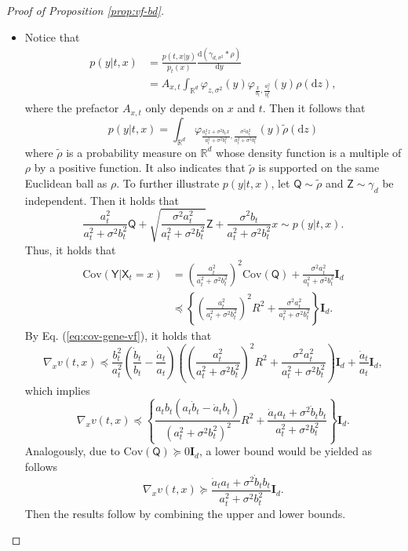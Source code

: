 \documentclass[twoside,11pt]{article}
\def\rmI{{\mathbf{I}}}
\def\sR{{\mathbb{R}}}
\newcommand{\Cov}{\mathrm{Cov}}
\def\paref#1{(\ref{#1})}
\newcommand{\diff}{\mathrm{d}}
\numberwithin{equation}{section}
\begin{document}
\begin{proof} [Proof of Proposition \ref{prop:vf-bd}]
\begin{itemize}
\item[(d)] Notice that
\begin{align*}
    p(y | t, x)
    &= \frac{p(t, x | y)}{p_t (x)} \frac{\diff (\gamma_{d, \sigma^2} * \rho)}{\diff y} \\
    &= A_{x,t} \int_{\sR^d} \varphi_{z, \sigma^2}(y) \varphi_{\tfrac{x}{b_t}, \tfrac{a_t^2}{b_t^2}} (y) \rho(\diff z),
\end{align*}
where the prefactor $A_{x,t}$ only depends on $x$ and $t$.
Then it follows that
\begin{equation*}
    p(y | t, x) = \int_{\sR^d} \varphi_{ \frac{a_t^2 z +\sigma^2 b_t x}{a_t^2 + \sigma^2 b_t^2}, \frac{\sigma^2 a_t^2}{a_t^2 + \sigma^2 b_t^2} }(y) \tilde \rho(\diff z)
\end{equation*}
where $\tilde \rho$ is a probability measure on $\sR^d$ whose density function is a multiple of $\rho$ by a positive function. It also indicates that $\tilde \rho$ is supported on the same Euclidean ball as $\rho$. To further illustrate $p(y | t, x)$, let $\mathsf{Q} \sim \tilde{\rho}$ and $\mathsf{Z} \sim \gamma_d$ be independent. Then it holds that
\begin{equation*}
    \frac{a_t^2}{a_t^2 + \sigma^2 b_t^2} \mathsf{Q} + \sqrt{\frac{\sigma^2 a_t^2}{a_t^2 + \sigma^2 b_t^2}} \mathsf{Z} + \frac{\sigma^2 b_t}{a_t^2 + \sigma^2 b_t^2} x \sim p(y | t, x).
\end{equation*}
Thus, it holds that
\begin{align*}
    \Cov (\mathsf{Y} | \mathsf{X}_t = x)
    &= \left( \frac{a_t^2}{a_t^2 + \sigma^2 b_t^2} \right)^2 \Cov(\mathsf{Q}) + \frac{\sigma^2 a_t^2}{a_t^2 + \sigma^2 b_t^2} \rmI_d \\
    & \preceq \left\{ \left( \frac{a_t^2}{a_t^2 + \sigma^2 b_t^2} \right)^2 R^2 + \frac{\sigma^2 a_t^2}{a_t^2 + \sigma^2 b_t^2} \right\} \rmI_d.
\end{align*}
By Eq. \paref{eq:cov-gene-vf}, it holds that
\begin{equation*}
    \nabla_x v(t, x) \preceq
    \frac{b_t^2}{a_t^2} \left( \frac{\dot{b}_t}{b_t} - \frac{\dot{a}_t}{a_t} \right) \left( \left( \frac{a_t^2}{a_t^2 + \sigma^2 b_t^2} \right)^2 R^2 + \frac{\sigma^2 a_t^2}{a_t^2 + \sigma^2 b_t^2} \right) \rmI_d + \frac{\dot{a}_t} {a_t} \rmI_d,
\end{equation*}
which implies
\begin{equation*}
    \nabla_x v(t, x) \preceq
    \left\{ \frac{a_t b_t (a_t \dot{b}_t - \dot{a}_t b_t)}{(a_t^2 + \sigma^2 b_t^2)^2} R^2 + \frac{\dot{a}_t a_t + \sigma^2 \dot{b}_t b_t}{a_t^2 + \sigma^2 b_t^2} \right\} \rmI_d.
\end{equation*}
Analogously, due to $\Cov(\mathsf{Q}) \succeq 0 \rmI_d$, a lower bound would be yielded as follows
\begin{equation*}
    \nabla_x v(t, x) \succeq
    \frac{\dot{a}_t a_t + \sigma^2 \dot{b}_t b_t}{a_t^2 + \sigma^2 b_t^2} \rmI_d.
\end{equation*}
Then the results follow by combining the upper and lower bounds.


\end{itemize}
\end{proof}
\end{document}
